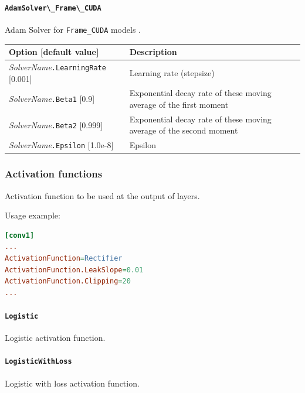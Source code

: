 \documentclass[a4paper,11pt,oneside]{article}
\begin{document}
\paragraph{\texorpdfstring{%
\lstinline[basicstyle=\ttfamily\bfseries]!AdamSolver\_Frame\_CUDA!}
{AdamSolver\_Frame\_CUDA}}
Adam Solver for \lstinline!Frame_CUDA! models \citep{KingmaB14}.

\begin{center}
 \begin{tabular}{| p{5cm} | p{10cm} | }
 \hline
 Option [default value] & Description\\
 \hline\hline
   \emph{SolverName}\lstinline!.LearningRate! [0.001] & Learning rate (stepsize) \\
   \emph{SolverName}\lstinline!.Beta1! [0.9] & Exponential decay rate of these moving
average of the first moment \\
   \emph{SolverName}\lstinline!.Beta2! [0.999] & Exponential decay rate of these moving
average of the second moment \\
   \emph{SolverName}\lstinline!.Epsilon! [1.0e-8] & Epsilon \\
 \hline
\end{tabular}
\end{center}



\subsubsection{Activation functions}
Activation function to be used at the output of layers.

Usage example:
\begin{lstlisting}[language=ini]
[conv1]
...
ActivationFunction=Rectifier
ActivationFunction.LeakSlope=0.01
ActivationFunction.Clipping=20
...
\end{lstlisting}

\paragraph{\texorpdfstring{%
\lstinline[basicstyle=\ttfamily\bfseries]!Logistic!}{Logistic}}
Logistic activation function.

\paragraph{\texorpdfstring{%
\lstinline[basicstyle=\ttfamily\bfseries]!LogisticWithLoss!}{LogisticWithLoss}}
Logistic with loss activation function.
\end{document}
